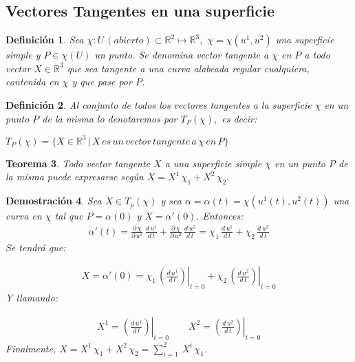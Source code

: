\documentclass[twoside]{article}
\newtheorem{theorem}{Teorema}[section]
\newtheorem{defi}[theorem]{Definición}
\newtheorem{dem}[theorem]{Demostración}
\numberwithin{equation}{section}
\begin{document}
\subsection{Vectores Tangentes en una superficie}

\begin{defi} Sea $\chi : U \, (abierto) \subset \mathbb{R}^2 \mapsto \mathbb{R}^3,$ $\chi = \chi(u^1, u^2)$ una superficie simple y $P \in \chi(U)$ un punto. Se denomina {\em vector tangente} a $\chi$ en $P$ a todo vector $X \in \mathbb{R}^3$ que sea tangente a una curva alabeada regular cualquiera, contenida en $\chi$ y que pase por $P$.
\end{defi}

\begin{defi}
Al conjunto de todos los vectores tangentes a la superficie $\chi$ en un punto $P$ de la misma lo denotaremos por $T_P(\chi),$ es decir:
\begin{center}
$T_P(\chi) = \{X \in \mathbb{R}^3 \,| \, X \, es \, un \, vector \, tangente \, a \, \chi \, en \, P \}$
\end{center}
\end{defi}

\begin{theorem}
Todo vector tangente $X$ a una superficie simple $\chi$ en un punto $P$ de la misma puede expresarse según $X = X^1 \, \chi_1 + X^2 \, \chi_2.$
\end{theorem}

\begin{dem}
Sea $X \in T_p(\chi)$ y sea $\alpha = \alpha(t) = \chi(u^1(t), u^2(t))$ una curva en $\chi$ tal que $P = \alpha(0)$ y $X = \alpha'(0).$
Entonces:
\begin{gather*}
\alpha'(t) = \frac{\partial \, \chi}{\partial \, u^1} \, \frac{d \, u^1}{d\, t} + \frac{\partial \, \chi}{\partial \, u^2} \, \frac{d \, u^2}{d\, t} = \chi_1 \, 
\frac{d \, u^1}{d\, t} + \chi_2 \,
\frac{d \, u^2}{d\, t}
\end{gather*}
Se tendrá que:

\begin{gather*}
X = \alpha'(0) = \chi_1 \, 
\left.\left(\frac{d \, u^1}{d\, t}\right)\right|_{t=0} + \chi_2 \,
\left.\left(\frac{d \, u^2}{d\, t}\right)\right|_{t=0}
\end{gather*}
Y llamando:

\begin{gather*}
X^1 = \left.\left(\frac{d \, u^1}{d\, t}\right)\right|_{t=0} \qquad  X^2 = \left.\left(\frac{d \, u^2}{d\, t}\right)\right|_{t=0}
\end{gather*}
Finalmente, $X = X^1 \, \chi_1 + X^2 \, \chi_2 = \sum^2_{i = 1} \, X^i \, \chi_1$.
\end{dem}
\end{document}
